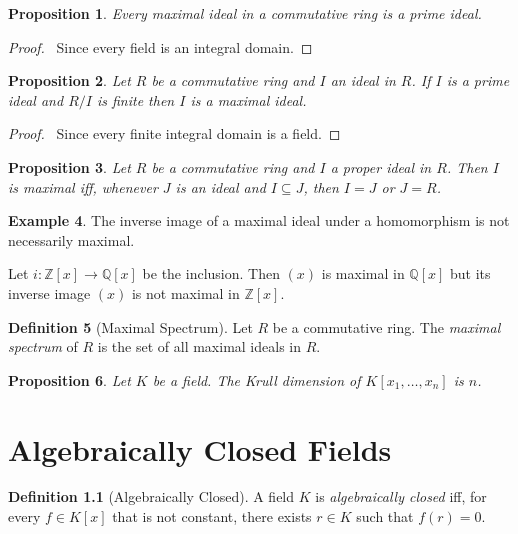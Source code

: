 \documentclass{book}
\let\qed\relax
\newtheorem{prop}{Proposition}[chapter]
\theoremstyle{definition}
\newtheorem{df}[prop]{Definition}
\newtheorem{ex}[prop]{Example}
\begin{document}
\begin{prop}
Every maximal ideal in a commutative ring is a prime ideal.
\end{prop}

\begin{proof}
\pf\ Since every field is an integral domain. \qed
\end{proof}

\begin{prop}
Let $R$ be a commutative ring and $I$ an ideal in $R$. If $I$ is a prime ideal and $R/I$ is finite then $I$ is a maximal ideal.
\end{prop}

\begin{proof}
\pf\ Since every finite integral domain is a field. \qed
\end{proof}

\begin{prop}
Let $R$ be a commutative ring and $I$ a proper ideal in $R$. Then $I$ is maximal iff, whenever $J$ is an ideal and $I \subseteq J$, then $I = J$ or $J = R$.
\end{prop}


\begin{ex}
The inverse image of a maximal ideal under a homomorphism is not necessarily maximal.

Let $i : \mathbb{Z}[x] \rightarrow \mathbb{Q}[x]$ be the inclusion. Then $(x)$ is maximal in $\mathbb{Q}[x]$ but its inverse image $(x)$ is not maximal in $\mathbb{Z}[x]$.
\end{ex}

\begin{df}[Maximal Spectrum]
Let $R$ be a commutative ring. The \emph{maximal spectrum} of $R$ is the set of all maximal ideals in $R$.
\end{df}

\begin{prop}
Let $K$ be a field. The Krull dimension of $K[x_1, \ldots, x_n]$ is $n$.
\end{prop}



\chapter{Algebraically Closed Fields}

\begin{df}[Algebraically Closed]
A field $K$ is \emph{algebraically closed} iff, for every $f \in K[x]$ that is not constant, there exists $r \in K$ such that $f(r) = 0$.
\end{df}
\end{document}
